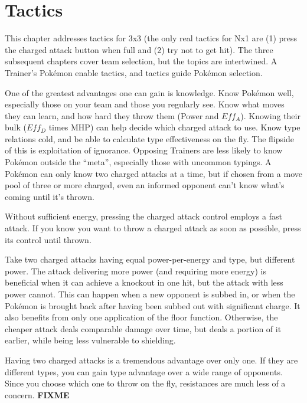 \chapter{Tactics\label{chap:strategy}}
This chapter addresses tactics for 3x3 (the only real tactics for Nx1 are (1)
  press the charged attack button when full and (2) try not to get hit).
The three subsequent chapters cover team selection, but the topics are intertwined.
A Trainer's Pokémon enable tactics, and tactics guide Pokémon selection.

One of the greatest advantages one can gain is knowledge.
Know Pokémon well, especially those on your team and those you regularly see.
Know what moves they can learn, and how hard they throw them (Power and $Eff_A$).
Knowing their bulk ($Eff_D$ times MHP) can help decide which charged attack to use.
Know type relations cold, and be able to calculate type effectiveness on the fly.
The flipside of this is exploitation of ignorance.
Opposing Trainers are less likely to know Pokémon outside the ``meta'',
 especially those with uncommon typings.
A Pokémon can only know two charged attacks at a time, but if
 chosen from a move pool of three or more charged, even an informed opponent
 can't know what's coming until it's thrown.

\begin{tipbox}[title=A tip regarding battle UI]
Without sufficient energy, pressing the charged attack control employs a fast attack.
If you know you want to throw a charged attack as soon as possible, press its control until thrown.
\end{tipbox}

Take two charged attacks having equal power-per-energy and type, but different power.
The attack delivering more power (and requiring more energy) is beneficial
 when it can achieve a knockout in one hit, but the attack with less power cannot.
This can happen when a new opponent is subbed in, or when the Pokémon is brought back
 after having been subbed out with significant charge.
It also benefits from only one application of the floor function.
Otherwise, the cheaper attack deals comparable damage over time, but deals a portion
 of it earlier, while being less vulnerable to shielding.

Having two charged attacks is a tremendous advantage over only one.
If they are different types, you can gain type advantage over a wide range of opponents.
Since you choose which one to throw on the fly, resistances are much less of a concern.
\textbf{FIXME}

